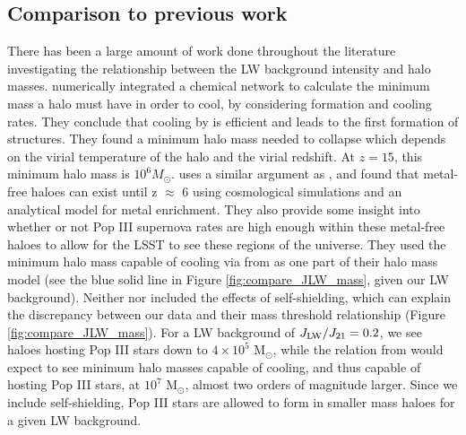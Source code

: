 \documentclass[fleqn,usenatbib]{mnras}
\begin{document}
\subsection{Comparison to previous work}

There has been a large amount of work done throughout the literature investigating the relationship between the LW background intensity and halo masses. \citet{Tegmark97} numerically integrated a chemical network to calculate the minimum mass a halo must have in order to cool, by considering \hh{} formation and cooling rates. They conclude that cooling by \hh{} is efficient and leads to the first formation of structures. They found a minimum halo mass needed to collapse which depends on the virial temperature of the halo and the virial redshift. At $z = 15$, this minimum halo mass is $10^{6} M_{\odot}$. \citet{Trenti09} uses a similar argument as \citet{Tegmark97}, and found that metal-free haloes can exist until z $\approx$ 6 using cosmological simulations and an analytical model for metal enrichment. They also provide some insight into whether or not Pop III supernova rates are high enough within these metal-free haloes to allow for the LSST to see these regions of the universe. They used the minimum halo mass capable of cooling via \hh{} from \citet{Trenti09_SFR} as one part of their halo mass model (see the blue solid line in Figure \ref{fig:compare_JLW_mass}, given our LW background). Neither \citet{Trenti09} nor \citet{Tegmark97} included the effects of \hh{} self-shielding, which can explain the discrepancy between our data and their mass threshold relationship (Figure \ref{fig:compare_JLW_mass}). For a LW background of $J_{\rm LW} / J_{21} = 0.2$, we see haloes hosting Pop III stars down to $4 \times 10^{5}$ M$_{\odot}$, while the relation from \citet{Trenti09_SFR} would expect to see minimum halo masses capable of cooling, and thus capable of hosting Pop III stars, at $10^7$ M$_{\odot}$, almost two orders of magnitude larger. Since we include \hh{} self-shielding, Pop III stars are allowed to form in smaller mass haloes for a given LW background. 
\end{document}
